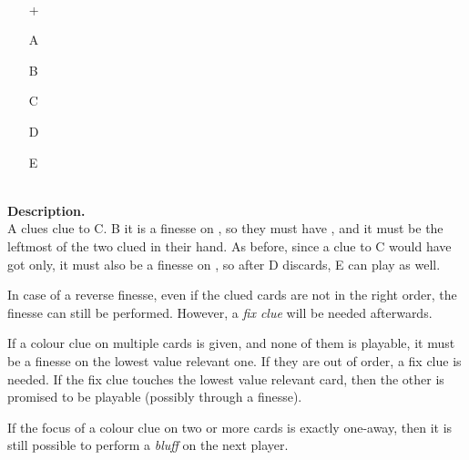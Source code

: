 \begin{example}	\hfill \\
	\begin{minipage}{0.45\textwidth}
		\begin{itemize}
			\item[\Large +]      
			\item[\Large A]    
			\item[\Large B]    
			\item[\Large C]    
			\item[\Large D]    
			\item[\Large E]    
		\end{itemize}
	\end{minipage}%
	\begin{minipage}{0.55\textwidth}
		\hfill \\
		
		\textbf{Description.} \\
		
		A clues  clue to C. B it is a finesse on , so they must have , and it must be the leftmost of the two clued  in their hand. As before, since a  clue to C would have got  only, it must also be a finesse on , so after D discards, E can play as well.
	\end{minipage}
\end{example} \vspace{0.15 cm}

In case of a reverse finesse, even if the clued cards are not in the right order, the finesse can still be performed. However, a \emph{fix clue} will be needed afterwards.

\begin{convention}
	If a colour clue on multiple cards is given, and none of them is playable, it must be a finesse on the lowest value relevant one. If they are out of order, a fix clue is needed. If the fix clue touches the lowest value relevant card, then the other is promised to be playable (possibly through a finesse).
\end{convention}

If the focus of a colour clue on two or more cards is exactly one-away, then it is still possible to perform a \emph{bluff} on the next player.

